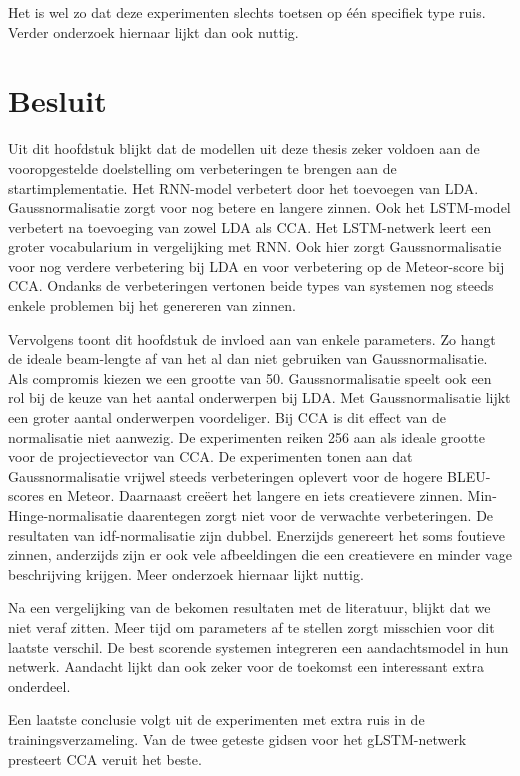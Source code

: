 Het is wel zo dat deze experimenten slechts toetsen op \'e\'en specifiek type ruis. Verder onderzoek hiernaar lijkt dan ook nuttig.

\section{Besluit} %
\label{sec:besluit}
Uit dit hoofdstuk blijkt dat de modellen uit deze thesis zeker voldoen aan de vooropgestelde doelstelling om verbeteringen te brengen aan de startimplementatie. Het RNN-model verbetert door het toevoegen van LDA. Gaussnormalisatie zorgt voor nog betere en langere zinnen.
Ook het LSTM-model verbetert na toevoeging van zowel LDA als CCA. Het LSTM-netwerk leert een groter vocabularium in vergelijking met RNN. Ook hier zorgt Gaussnormalisatie voor nog verdere verbetering bij LDA en voor verbetering op de Meteor-score bij CCA.
Ondanks de verbeteringen vertonen beide types van systemen nog steeds enkele problemen bij het genereren van zinnen.

Vervolgens toont dit hoofdstuk de invloed aan van enkele parameters. Zo hangt de ideale beam-lengte af van het al dan niet gebruiken van Gaussnormalisatie. Als compromis kiezen we een grootte van 50.
Gaussnormalisatie speelt ook een rol bij de keuze van het aantal onderwerpen bij LDA. Met Gaussnormalisatie lijkt een groter aantal onderwerpen voordeliger.
Bij CCA is dit effect van de normalisatie niet aanwezig. De experimenten reiken 256 aan als ideale grootte voor de projectievector van CCA.
De experimenten tonen aan dat Gaussnormalisatie vrijwel steeds verbeteringen oplevert voor de hogere BLEU-scores en Meteor. Daarnaast cre\"eert het langere en iets creatievere zinnen. Min-Hinge-normalisatie daarentegen zorgt niet voor de verwachte verbeteringen.
De resultaten van idf-normalisatie zijn dubbel. Enerzijds genereert het soms foutieve zinnen, anderzijds zijn er ook vele afbeeldingen die een creatievere en minder vage beschrijving krijgen. Meer onderzoek hiernaar lijkt nuttig.

Na een vergelijking van de bekomen resultaten met de literatuur, blijkt dat we niet veraf zitten. Meer tijd om parameters af te stellen zorgt misschien voor dit laatste verschil. De best scorende systemen integreren een aandachtsmodel in hun netwerk. Aandacht lijkt dan ook zeker voor de toekomst een interessant extra onderdeel.

Een laatste conclusie volgt uit de experimenten met extra ruis in de trainingsverzameling. Van de twee geteste gidsen voor het gLSTM-netwerk presteert CCA veruit het beste.


